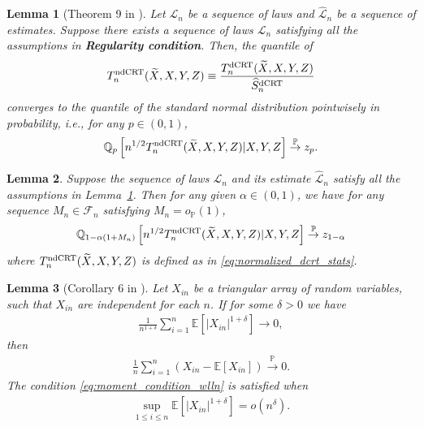 \documentclass[12pt]{article}
\newtheorem{lemma}{Lemma}
\theoremstyle{definition}
\def\P{\mathbb{P}}
\def\P{\mathbb{P}}
\newcommand{\E}{\mathbb E}								%
\renewcommand{\P}{\mathbb{P}}							%
\newcommand{\Q}{\mathbb{Q}}								%
\newcommand{\convp}{\overset{\mathbb{P}}{\rightarrow}}             %
\newcommand{\srx}{X}									%
\newcommand{\srz}{Z}									%
\newcommand{\srxk}{\widetilde X}						%
\newcommand{\sry}{Y}									%
\newcommand{\law}{\mathcal L}							%
\newcommand{\lawhat}{\widehat{\mathcal L}}				%
\newcommand{\dCRT}{\textnormal{dCRT}} 					%
\newcommand{\ndCRThat}{\textnormal{ndCRT}}	%
\begin{document}
\begin{lemma}[Theorem 9 in \cite{Niu2022a}]\label{lem:quantile_convergence_ptwise}
	Let $\law_n$ be a sequence of laws and $\lawhat_n$ be a sequence of estimates. Suppose  there exists a sequence of laws $\law_n$ satisfying all the assumptions in \textbf{Regularity condition}. Then, the quantile of 
  \begin{align}\label{eq:normalized_dcrt_stats}
    T_n^{\ndCRThat}(\srxk,\srx,\sry,\srz)\equiv \frac{T_n^{\dCRT}(\srxk,\srx,\sry,\srz)}{\widehat S_n^{\dCRT}}
  \end{align}
  converges to the quantile of the standard normal distribution pointwisely in probability, i.e., for any $p\in(0,1)$,
	\begin{align*}
		\Q_{p}\left[n^{1/2}T_n^{\ndCRThat}(\srxk,\srx,\sry,\srz)|\srx,\sry,\srz\right]\convp z_{p}.
	\end{align*}
\end{lemma}

\begin{lemma}\label{lem:quantile_equivalence}
  Suppose the sequence of laws $\law_n$ and its estimate $\lawhat_n$ satisfy all the assumptions in Lemma~\ref{lem:quantile_convergence_ptwise}. Then for any given $\alpha\in (0,1)$, we have for any sequence $M_n\in\mathcal{F}_n$ satisfying $M_n=o_\P(1)$,
  \begin{align*}
  \Q_{1-\alpha(1+M_n)}\left[n^{1/2}T_n^{\ndCRThat}(\srxk, \srx, \sry,\srz)|\srx,\sry,\srz\right]\convp z_{1-\alpha}
  \end{align*}
  where $T_n^{\ndCRThat}(\srxk,\srx,\sry,\srz)$ is defined as in \eqref{eq:normalized_dcrt_stats}.
\end{lemma}

\begin{lemma}[Corollary 6 in \cite{Niu2022a}]\label{lem:wlln}
  Let $X_{in}$ be a triangular array of random variables, such that $X_{in}$ are independent for each $n$. If for some $\delta>0$ we have 
  \begin{align}\label{eq:moment_condition_wlln}
    \frac{1}{n^{1+\delta}}\sum_{i=1}^n \E[|X_{in}|^{1+\delta}]\rightarrow 0,
  \end{align}
  then 
  \begin{align*}
    \frac{1}{n}\sum_{i=1}^n (X_{in}-\E[X_{in}])\overset{\P}{\rightarrow}0.
  \end{align*}
  The condition \eqref{eq:moment_condition_wlln} is satisfied when 
  \begin{align*}
    \sup_{1\leq i\leq n}\E[|X_{in}|^{1+\delta}]=o(n^\delta).
  \end{align*}
\end{lemma}
\end{document}
